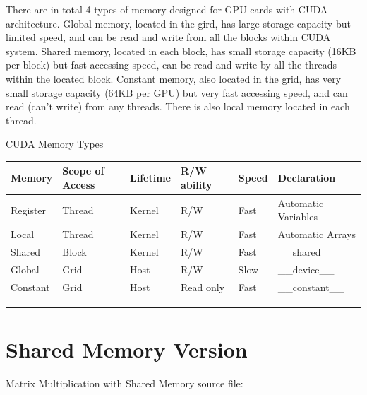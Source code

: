 \documentclass[letterpaper,10pt,openany,oneside]{sphinxmanual}
\begin{document}
There are in total 4 types of memory designed for GPU cards with CUDA architecture. Global memory, located in the gird, has large storage capacity but limited speed, and can be read and write from all the blocks within CUDA system. Shared memory, located in each block, has small storage capacity (16KB per block) but fast accessing speed, can be read and write by all the threads within the located block. Constant memory, also located in the grid, has very small storage capacity (64KB per GPU) but very fast accessing speed, and can read (can't write) from any threads. There is also local memory located in each thread.


\begin{threeparttable}
\capstart\caption{CUDA Memory Types}

\begin{tabulary}{\linewidth}{|L|L|L|L|L|L|}
\hline
\textbf{
Memory
} & \textbf{
Scope of Access
} & \textbf{
Lifetime
} & \textbf{
R/W ability
} & \textbf{
Speed
} & \textbf{
Declaration
}\\\hline

Register
 & 
Thread
 & 
Kernel
 & 
R/W
 & 
Fast
 & 
Automatic Variables
\\\hline

Local
 & 
Thread
 & 
Kernel
 & 
R/W
 & 
Fast
 & 
Automatic Arrays
\\\hline

Shared
 & 
Block
 & 
Kernel
 & 
R/W
 & 
Fast
 & 
\_\_shared\_\_
\\\hline

Global
 & 
Grid
 & 
Host
 & 
R/W
 & 
Slow
 & 
\_\_device\_\_
\\\hline

Constant
 & 
Grid
 & 
Host
 & 
Read only
 & 
Fast
 & 
\_\_constant\_\_
\\\hline
\end{tabulary}

\end{threeparttable}



\bigskip\hrule{}\bigskip



\section{Shared Memory Version}
\label{CUDA2D/CUDA2D:tesla-c2075}\label{CUDA2D/CUDA2D:shared-memory-version}
Matrix Multiplication with Shared Memory source file:
\end{document}
